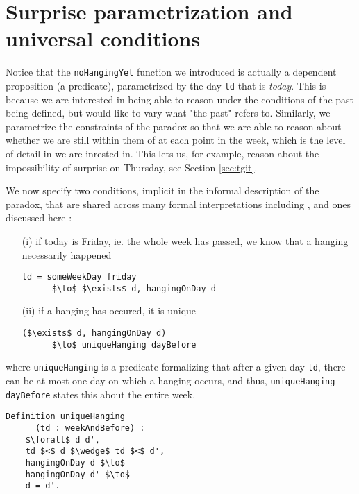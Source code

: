 \documentclass[journal]{journal}
\begin{document}
\section{Surprise parametrization and universal conditions}
\label{sec:universal}

Notice that the {\tt noHangingYet} function we introduced is actually a
dependent proposition (a predicate), parametrized by
the day {\tt td} that is \emph{today}. This is because we are interested in
being able to reason under the conditions of the past being defined, but
would like to vary what "the past" refers to. Similarly, we parametrize the
constraints of the paradox so that we are able to reason about
whether we are still within them of at each point in the week,
which is the level of detail in we are inrested in. This lets us, for example,
reason about the impossibility of surprise on Thursday, see Section \ref{sec:tgit}.

We now specify two conditions, implicit in the informal
description of the paradox, that are shared across
many formal interpretations including \cite{} \cite{},  and ones discussed here :

\begin{itemize}
  \item[(i)] if today is Friday, ie. the whole
  week has passed, we know that a hanging necessarily happened
  \begin{lstlisting}[mathescape=true]
    td = someWeekDay friday
      $\to$ $\exists$ d, hangingOnDay d
  \end{lstlisting}
  \item[(ii)] if a hanging has occured, it is unique
  \begin{lstlisting}[mathescape=true]
    ($\exists$ d, hangingOnDay d)
      $\to$ uniqueHanging dayBefore
  \end{lstlisting}
\end{itemize}

where {\tt uniqueHanging} is a predicate formalizing that after a given day {\tt td},
there can be at most one day on which a hanging occurs, and thus,
{\tt uniqueHanging dayBefore} states this about the entire week.

\begin{lstlisting}[mathescape=true]
  Definition uniqueHanging
      (td : weekAndBefore) :
    $\forall$ d d',
    td $<$ d $\wedge$ td $<$ d',
    hangingOnDay d $\to$
    hangingOnDay d' $\to$
    d = d'.
\end{lstlisting}
\end{document}
